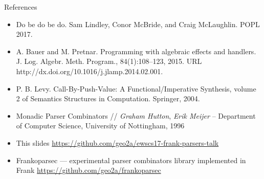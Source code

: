 \begin{frame}{References}

\begin{itemize}
  \item Do be do be do. Sam Lindley, Conor McBride, and Craig McLaughlin. POPL 2017.
  \item A. Bauer and M. Pretnar. Programming with algebraic effects and handlers. J. Log. Algebr. Meth. Program., 84(1):108–123, 2015. URL http://dx.doi.org/10.1016/j.jlamp.2014.02.001.
  \item P. B. Levy. Call-By-Push-Value: A Functional/Imperative Synthesis, volume 2 of Semantics Structures in Computation. Springer, 2004.
  \item Monadic Parser Combinators // \textit{Graham Hutton}, \textit{Erik Meijer} – Department of Computer Science, University of Nottingham, 1996
  \item This slides \url{https://github.com/geo2a/ewscs17-frank-parsers-talk}
  \item Frankoparsec --- experimental parser combinators library implemented in Frank \url{https://github.com/geo2a/frankoparsec}
\end{itemize}

\end{frame}


